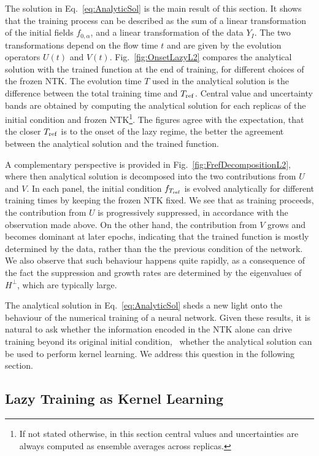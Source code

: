 The solution in Eq.~\eqref{eq:AnalyticSol} is the main result of this section.
It shows that the training process can be described as the sum of a linear
transformation of the initial fields $f_{0,\alpha}$, and a linear transformation
of the data $Y_I$. The two transformations depend on the flow time $t$ and are
given by the evolution operators $U(t)$ and $V(t)$. Fig.~\ref{fig:OnsetLazyL2}
compares the analytical solution with the trained function at the end of
training, for different choices of the frozen NTK. The evolution time $T$ used
in the analytical solution is the difference between the total training time and
$T_{\rm ref}$. Central value and uncertainty bands are obtained by computing the
analytical solution for each replicas of the initial condition and frozen NTK\footnote{
  If not stated otherwise, in this section central values and uncertainties are
  always computed as ensemble averages across replicas.
}.
The figures agree with the expectation, that the closer $T_{\rm ref}$ is to the
onset of the lazy regime, the better the agreement between the analytical
solution and the trained function.

A complementary perspective is provided in Fig.~\ref{fig:FrefDecompositionL2},
where then analytical solution is decomposed into the two contributions from $U$
and $V$. In each panel, the initial condition $f_{T_{\rm ref}}$ is evolved
analytically for different training times by keeping the frozen NTK fixed. We
see that as training proceeds, the contribution from $U$ is progressively
suppressed, in accordance with the observation made above. On the other hand,
the contribution from $V$ grows and becomes dominant at later epochs, indicating
that the trained function is mostly determined by the data, rather than the the
previous condition of the network. We also observe that such behaviour happens
quite rapidly, as a consequence of the fact the suppression and growth rates are
determined by the eigenvalues of $H^\perp$, which are typically large.

The analytical solution in Eq.~\eqref{eq:AnalyticSol} sheds a new light onto the
behaviour of the numerical training of a neural network. Given these results, it
is natural to ask whether the information encoded in the NTK alone can drive
training beyond its original initial condition, \ie\ whether the analytical
solution can be used to perform kernel learning. We address this question in the
following section.

\subsection{Lazy Training as Kernel Learning}
\label{sec:NTKKernelLearning}

